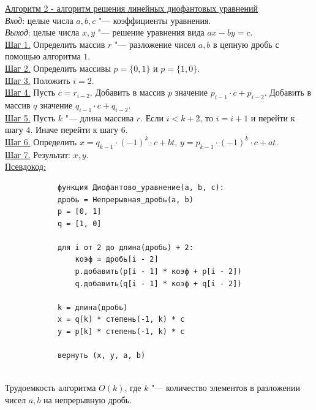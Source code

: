 \documentclass[bachelor, och, labwork]{shiza}
\begin{document}
        \underline{Алгоритм 2 - алгоритм решения линейных диофантовых уравнений}\\
            \textit{Вход}: целые числа $a, b, c$ "--- коэффициенты уравнения.\\
            \textit{Выход}: целые числа $x, y$ "--- решение уравнения вида $ax - by = c$.\\
            \underline{Шаг 1.} Определить массив $r$ "--- разложение чисел $a, b$ в
            цепную дробь с помощью алгоритма $1$.\\ 
            \underline{Шаг 2.} Определить массивы $p = \{0, 1\}$ и $p = \{1, 0\}$.\\
            \underline{Шаг 3.} Положить $i = 2$.\\
            \underline{Шаг 4.} Пусть $c = r_{i - 2}$. Добавить в массив $p$
            значение $p_{i-1} \cdot c + p_{i-2}$. Добавить в массив $q$
            значение $q_{i-1} \cdot c + q_{i-2}$.\\
            \underline{Шаг 5.} Пусть $k$ "--- длина массива $r$. Если $i < k +
            2$, то $i = i + 1$ и перейти к шагу $4$. Иначе перейти к шагу $6$.\\
            \underline{Шаг 6.} Определить $x = q_{k-1} \cdot (-1)^k \cdot c + bt$, $y =
            p_{k-1} \cdot (-1)^k \cdot c + at$.\\
            \underline{Шаг 7.} Результат: $x, y$.\\
            
        \underline{Псевдокод:}
            \begin{verbatim}
            функция Диофантово_уравнение(a, b, c):
            дробь = Непрерывная_дробь(a, b)
            p = [0, 1]
            q = [1, 0]
            
            для i от 2 до длина(дробь) + 2:
                коэф = дробь[i - 2]
                p.добавить(p[i - 1] * коэф + p[i - 2])
                q.добавить(q[i - 1] * коэф + q[i - 2])
        
            k = длина(дробь)
            x = q[k] * степень(-1, k) * c
            y = p[k] * степень(-1, k) * c
        
            вернуть (x, y, a, b)
                         
            \end{verbatim}

            Трудоемкость алгоритма $O(k)$, где $k$ "--- количество элементов в
            разложении чисел $a, b$ на непрерывную дробь.\\
\end{document}
